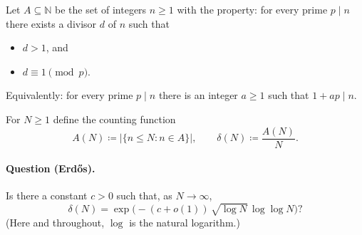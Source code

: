 \begin{definition}
Let $A\subseteq \mathbb{N}$ be the set of integers $n\ge 1$ with the property:
for every prime $p\mid n$ there exists a divisor $d$ of $n$ such that
\begin{itemize}[leftmargin=2em]
\item $d>1$, and
\item $d\equiv 1\pmod p$.
\end{itemize}
Equivalently: for every prime $p\mid n$ there is an integer $a\ge 1$ such that $1+ap\mid n$.
\end{definition}

For $N\ge 1$ define the counting function
\[
A(N)\coloneqq |\{n\le N: n\in A\}|,
\qquad \delta(N)\coloneqq \frac{A(N)}{N}.
\]

\paragraph{Question (Erd\H{o}s).}
Is there a constant $c>0$ such that, as $N\to\infty$,
\[
\delta(N)=\exp\bigl(-(c+o(1))\,\sqrt{\log N}\,\log\log N\bigr)?
\]
(Here and throughout, $\log$ is the natural logarithm.)
